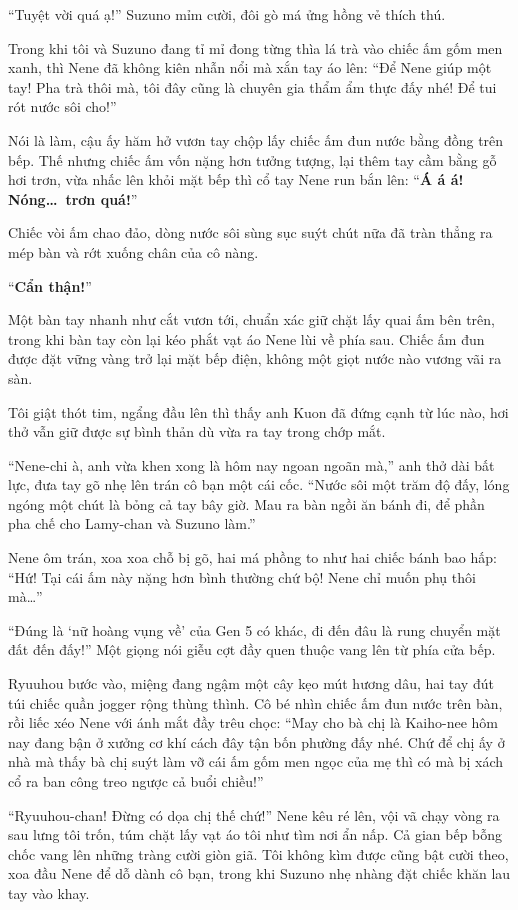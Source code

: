 \documentclass[../main.tex]{subfiles}
\begin{document}
``Tuyệt vời quá ạ!'' Suzuno mỉm cười, đôi gò má ửng hồng vẻ thích thú.

Trong khi tôi và Suzuno đang tỉ mỉ đong từng thìa lá trà vào chiếc ấm gốm men xanh, thì Nene đã không kiên nhẫn nổi mà xắn tay áo lên: ``Để Nene giúp một tay! Pha trà thôi mà, tôi đây cũng là chuyên gia thẩm ẩm thực đấy nhé! Để tui rót nước sôi cho!''

Nói là làm, cậu ấy hăm hở vươn tay chộp lấy chiếc ấm đun nước bằng đồng trên bếp. Thế nhưng chiếc ấm vốn nặng hơn tưởng tượng, lại thêm tay cầm bằng gỗ hơi trơn, vừa nhấc lên khỏi mặt bếp thì cổ tay Nene run bắn lên: ``\textbf{Á á á! Nóng\dots\ trơn quá!}''

Chiếc vòi ấm chao đảo, dòng nước sôi sùng sục suýt chút nữa đã tràn thẳng ra mép bàn và rớt xuống chân của cô nàng.

``\textbf{Cẩn thận!}''

Một bàn tay nhanh như cắt vươn tới, chuẩn xác giữ chặt lấy quai ấm bên trên, trong khi bàn tay còn lại kéo phắt vạt áo Nene lùi về phía sau. Chiếc ấm đun được đặt vững vàng trở lại mặt bếp điện, không một giọt nước nào vương vãi ra sàn.

Tôi giật thót tim, ngẩng đầu lên thì thấy anh Kuon đã đứng cạnh từ lúc nào, hơi thở vẫn giữ được sự bình thản dù vừa ra tay trong chớp mắt.

``Nene-chi à, anh vừa khen xong là hôm nay ngoan ngoãn mà,'' anh thở dài bất lực, đưa tay gõ nhẹ lên trán cô bạn một cái cốc. ``Nước sôi một trăm độ đấy, lóng ngóng một chút là bỏng cả tay bây giờ. Mau ra bàn ngồi ăn bánh đi, để phần pha chế cho Lamy-chan và Suzuno làm.''

Nene ôm trán, xoa xoa chỗ bị gõ, hai má phồng to như hai chiếc bánh bao hấp: ``Hứ! Tại cái ấm này nặng hơn bình thường chứ bộ! Nene chỉ muốn phụ thôi mà\dots''

``Đúng là `nữ hoàng vụng về' của Gen 5 có khác, đi đến đâu là rung chuyển mặt đất đến đấy!'' Một giọng nói giễu cợt đầy quen thuộc vang lên từ phía cửa bếp.

Ryuuhou bước vào, miệng đang ngậm một cây kẹo mút hương dâu, hai tay đút túi chiếc quần jogger rộng thùng thình. Cô bé nhìn chiếc ấm đun nước trên bàn, rồi liếc xéo Nene với ánh mắt đầy trêu chọc: ``May cho bà chị là Kaiho-nee hôm nay đang bận ở xưởng cơ khí cách đây tận bốn phường đấy nhé. Chứ để chị ấy ở nhà mà thấy bà chị suýt làm vỡ cái ấm gốm men ngọc của mẹ thì có mà bị xách cổ ra ban công treo ngược cả buổi chiều!''

``Ryuuhou-chan! Đừng có dọa chị thế chứ!'' Nene kêu ré lên, vội vã chạy vòng ra sau lưng tôi trốn, túm chặt lấy vạt áo tôi như tìm nơi ẩn nấp. Cả gian bếp bỗng chốc vang lên những tràng cười giòn giã. Tôi không kìm được cũng bật cười theo, xoa đầu Nene để dỗ dành cô bạn, trong khi Suzuno nhẹ nhàng đặt chiếc khăn lau tay vào khay.
\end{document}
